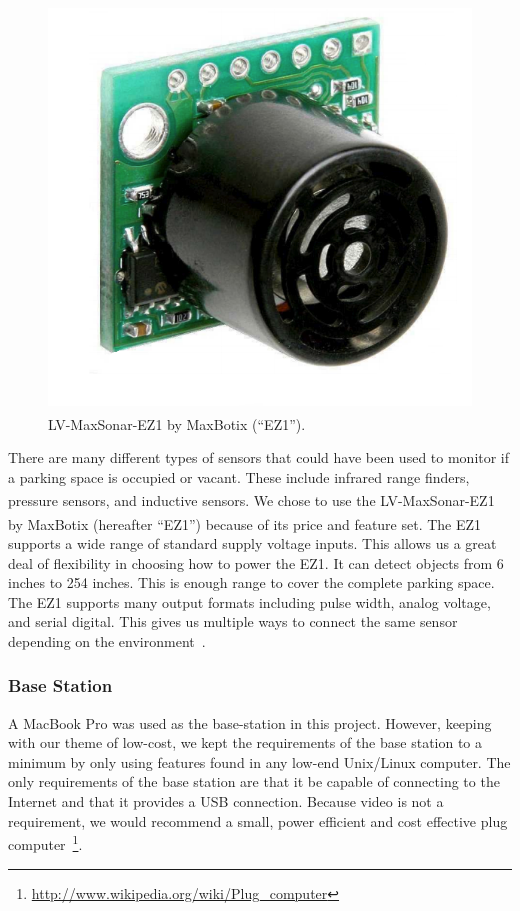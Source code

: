 \documentclass{acm_proc}
\begin{document}
\begin{figure}
    \begin{center}
		\includegraphics[width=\columnwidth]{figures/range_finder}
	\end{center}
	\caption{LV-MaxSonar\textsuperscript{\textregistered}-EZ1\textsuperscript{\texttrademark}
	by MaxBotix\textsuperscript{\textregistered} (``EZ1'').}
	\label{fig:range_finder}
\end{figure}

There are many different types of sensors that could have been used to
monitor if a parking space is occupied or vacant.  These include infrared
range finders, pressure sensors, and inductive sensors.
We chose to use the
LV-MaxSonar\textsuperscript{\textregistered}-EZ1\textsuperscript{\texttrademark}
by MaxBotix\textsuperscript{\textregistered} (hereafter ``EZ1'')
because of its price and feature set.
The EZ1 supports a wide range of standard supply voltage inputs.
This allows us a great deal of flexibility in choosing how to power the
EZ1.
It can detect objects from 6 inches to 254 inches.
This is enough range to cover the complete parking space.
The EZ1 supports many output formats including pulse width, analog voltage,
and serial digital.
This gives us multiple ways to connect the same sensor depending on the
environment~\cite{maxbotix:maxsonar-datasheet}.

\subsubsection{Base Station}
A MacBook Pro was used as the base-station in this project.
However, keeping with our theme of low-cost, we kept the
requirements of the base station to a minimum by only using features found
in any low-end Unix/Linux computer.
The only requirements of the base station are that it be capable of
connecting to the Internet and that it provides a USB connection.
Because video is not a requirement, we would recommend a small, power
efficient and cost effective plug
computer~\footnote{\url{http://www.wikipedia.org/wiki/Plug_computer}}.
\end{document}
